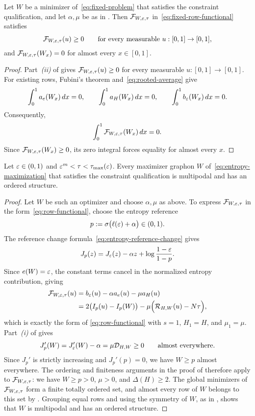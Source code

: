 \begin{lemma}\label{lem:fixed-insertion}
Let $W$ be a minimizer of~\eqref{eq:fixed-problem} that satisfies the
constraint qualification, and let $\alpha,\mu$ be as in
. Then $\mathcal F_{W,\varepsilon,\tau}$
in~\eqref{eq:fixed-row-functional} satisfies
\[
  \mathcal F_{W,\varepsilon,\tau}(u)\ge0
  \qquad\text{for every measurable }u:[0,1]\to[0,1],
\]
and $\mathcal F_{W,\varepsilon,\tau}(W_x)=0$ for almost every $x\in[0,1]$.
\end{lemma}

\begin{proof}
Part~\textit{(ii)} of  gives
$\mathcal F_{W,\varepsilon,\tau}(u)\ge0$ for every measurable $u:[0,1]\to[0,1]$.
For existing rows, Fubini's theorem and~\eqref{eq:rooted-average} give
\[
  \int_0^1a_e(W_x)\,d x=0,\qquad
  \int_0^1a_H(W_x)\,d x=0,\qquad
  \int_0^1b_\varepsilon(W_x)\,d x=0.
\]
Consequently,
\[
  \int_0^1\mathcal F_{W,\varepsilon,\tau}(W_x)\,d x=0.
\]
Since $\mathcal F_{W,\varepsilon,\tau}(W_x)\ge0$, its zero integral
forces equality for almost every $x$.
\end{proof}

\begin{prop}\label{prop:nondegenerate-multipodality}
Let $\varepsilon\in(0,1)$ and $\varepsilon^m<\tau<\tau_{\max}(\varepsilon)$.  Every maximizer graphon $W$
of~\eqref{eq:entropy-maximization} that satisfies the constraint qualification
is multipodal and has an ordered structure.
\end{prop}

\begin{proof}
Let $W$ be such an optimizer and choose $\alpha,\mu$ as above.
To express $\mathcal F_{W,\varepsilon,\tau}$ in the form~\eqref{eq:row-functional},
choose the entropy reference
\[
  p:=\sigma\bigl(\ell(\varepsilon)+\alpha\bigr)\in(0,1).
\]
The reference change formula~\eqref{eq:entropy-reference-change} gives
\[
  J_p(z)=J_\varepsilon(z)-\alpha z+\log\frac{1-\varepsilon}{1-p}.
\]
Since $e(W)=\varepsilon$, the constant terms cancel in the normalized entropy
contribution, giving
\begin{align*}
  \mathcal F_{W,\varepsilon,\tau}(u)
  &=b_\varepsilon(u)-\alpha a_e(u)-\mu a_H(u)\\
  &=2\bigl(I_p(u)-I_p(W)\bigr)
  -\mu\Bigl(\mathcal R_{H,W}(u)-N\tau\Bigr),
\end{align*}
which is exactly the form of
\eqref{eq:row-functional} with $s=1$, $H_1=H$, and $\mu_1=\mu$.
Part~\textit{(i)} of
 gives
\[
  J_p'(W)=J_\varepsilon'(W)-\alpha=\mu\mathcal D_{H,W}\ge0
  \qquad\text{almost everywhere}.
\]
Since $J_p'$ is strictly increasing and $J_p'(p)=0$, we have $W\ge p$
almost everywhere. The ordering and finiteness arguments in the proof of
 therefore apply to $\mathcal F_{W,\varepsilon,\tau}$:
we have $W\ge p>0$, $\mu>0$, and $\Delta(H)\ge2$.
The global minimizers of $\mathcal F_{W,\varepsilon,\tau}$ form a finite totally ordered set, and almost every
row of $W$ belongs to this set by .
Grouping equal rows and using the symmetry of $W$, as in
, shows that $W$ is multipodal and has an
ordered structure.
\end{proof}
